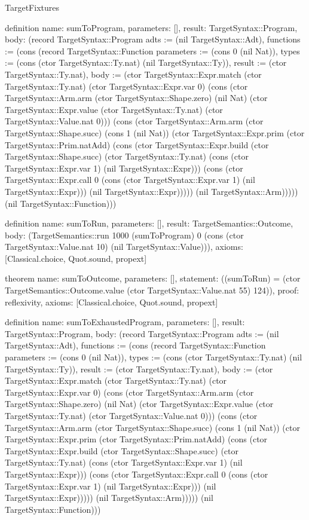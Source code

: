 \begin{lexlean}{TargetFixtures}
\begin{semanticmodule}
definition{
  name: sumToProgram,
  parameters: [],
  result: TargetSyntax::Program,
  body: (record TargetSyntax::Program {adts := (nil TargetSyntax::Adt), functions := (cons (record TargetSyntax::Function {parameters := (cons 0 (nil Nat)), types := (cons (ctor TargetSyntax::Ty.nat) (nil TargetSyntax::Ty)), result := (ctor TargetSyntax::Ty.nat), body := (ctor TargetSyntax::Expr.match (ctor TargetSyntax::Ty.nat) (ctor TargetSyntax::Expr.var 0) (cons (ctor TargetSyntax::Arm.arm (ctor TargetSyntax::Shape.zero) (nil Nat) (ctor TargetSyntax::Expr.value (ctor TargetSyntax::Ty.nat) (ctor TargetSyntax::Value.nat 0))) (cons (ctor TargetSyntax::Arm.arm (ctor TargetSyntax::Shape.succ) (cons 1 (nil Nat)) (ctor TargetSyntax::Expr.prim (ctor TargetSyntax::Prim.natAdd) (cons (ctor TargetSyntax::Expr.build (ctor TargetSyntax::Shape.succ) (ctor TargetSyntax::Ty.nat) (cons (ctor TargetSyntax::Expr.var 1) (nil TargetSyntax::Expr))) (cons (ctor TargetSyntax::Expr.call 0 (cons (ctor TargetSyntax::Expr.var 1) (nil TargetSyntax::Expr))) (nil TargetSyntax::Expr))))) (nil TargetSyntax::Arm))))}) (nil TargetSyntax::Function))})
}

definition{
  name: sumToRun,
  parameters: [],
  result: TargetSemantics::Outcome,
  body: (TargetSemantics::run 1000 (sumToProgram) 0 (cons (ctor TargetSyntax::Value.nat 10) (nil TargetSyntax::Value))),
  axioms: [Classical.choice, Quot.sound, propext]
}

theorem{
  name: sumToOutcome,
  parameters: [],
  statement: ((sumToRun) = (ctor TargetSemantics::Outcome.value (ctor TargetSyntax::Value.nat 55) 124)),
  proof: reflexivity{},
  axioms: [Classical.choice, Quot.sound, propext]
}

definition{
  name: sumToExhaustedProgram,
  parameters: [],
  result: TargetSyntax::Program,
  body: (record TargetSyntax::Program {adts := (nil TargetSyntax::Adt), functions := (cons (record TargetSyntax::Function {parameters := (cons 0 (nil Nat)), types := (cons (ctor TargetSyntax::Ty.nat) (nil TargetSyntax::Ty)), result := (ctor TargetSyntax::Ty.nat), body := (ctor TargetSyntax::Expr.match (ctor TargetSyntax::Ty.nat) (ctor TargetSyntax::Expr.var 0) (cons (ctor TargetSyntax::Arm.arm (ctor TargetSyntax::Shape.zero) (nil Nat) (ctor TargetSyntax::Expr.value (ctor TargetSyntax::Ty.nat) (ctor TargetSyntax::Value.nat 0))) (cons (ctor TargetSyntax::Arm.arm (ctor TargetSyntax::Shape.succ) (cons 1 (nil Nat)) (ctor TargetSyntax::Expr.prim (ctor TargetSyntax::Prim.natAdd) (cons (ctor TargetSyntax::Expr.build (ctor TargetSyntax::Shape.succ) (ctor TargetSyntax::Ty.nat) (cons (ctor TargetSyntax::Expr.var 1) (nil TargetSyntax::Expr))) (cons (ctor TargetSyntax::Expr.call 0 (cons (ctor TargetSyntax::Expr.var 1) (nil TargetSyntax::Expr))) (nil TargetSyntax::Expr))))) (nil TargetSyntax::Arm))))}) (nil TargetSyntax::Function))})
}


\end{semanticmodule}
\end{lexlean}
